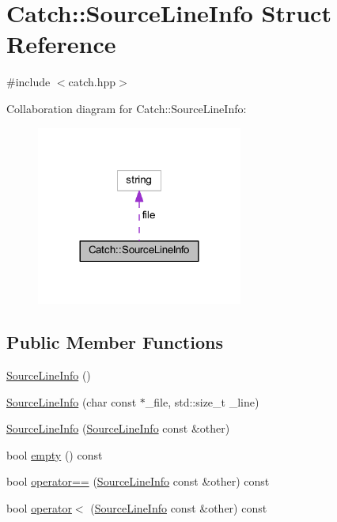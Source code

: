 \hypertarget{struct_catch_1_1_source_line_info}{}\section{Catch\+:\+:Source\+Line\+Info Struct Reference}
\label{struct_catch_1_1_source_line_info}


{\ttfamily \#include $<$catch.\+hpp$>$}



Collaboration diagram for Catch\+:\+:Source\+Line\+Info\+:\nopagebreak
\begin{figure}[H]
\begin{center}
\leavevmode
\includegraphics[width=192pt]{struct_catch_1_1_source_line_info__coll__graph}
\end{center}
\end{figure}
\subsection*{Public Member Functions}
\begin{DoxyCompactItemize}
\item 
\hyperlink{struct_catch_1_1_source_line_info_a9d44b2e1133794eee0bd5716424c83d6}{Source\+Line\+Info} ()
\item 
\hyperlink{struct_catch_1_1_source_line_info_a6218cb890337d37f708ea94063958940}{Source\+Line\+Info} (char const $\ast$\+\_\+file, std\+::size\+\_\+t \+\_\+line)
\item 
\hyperlink{struct_catch_1_1_source_line_info_a1ec99cc0547ce5909133aaa8f14ed4b1}{Source\+Line\+Info} (\hyperlink{struct_catch_1_1_source_line_info}{Source\+Line\+Info} const \&other)
\item 
bool \hyperlink{struct_catch_1_1_source_line_info_a05ab6444e9de7e9c3e76d8aa00093c3a}{empty} () const
\item 
bool \hyperlink{struct_catch_1_1_source_line_info_a688e761986879266658f000f14ab8a42}{operator==} (\hyperlink{struct_catch_1_1_source_line_info}{Source\+Line\+Info} const \&other) const
\item 
bool \hyperlink{struct_catch_1_1_source_line_info_a8b99a0d7b1553d8c2298c694db924be3}{operator$<$} (\hyperlink{struct_catch_1_1_source_line_info}{Source\+Line\+Info} const \&other) const
\end{DoxyCompactItemize}
